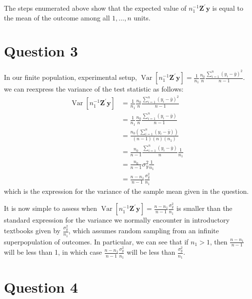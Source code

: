 \documentclass[
  12pt,
  leqno]{article}
\DeclareMathOperator{\Var}{\mathrm{Var}}
\DeclareMathOperator{\1}{\mathbbm{1}}
\begin{document}
The steps enumerated above show that the expected value of
\(n_1^{-1} \mathbf{Z}^{\prime}\mathbf{y}\) is equal to the mean of the
outcome among all \(1, \dots , n\) units.

\section*{Question 3}

In our finite population, experimental setup,
\(\Var\left[n_1^{-1} \mathbf{Z}^{\prime}\mathbf{y}\right] = \frac{1}{n_1} \frac{n_0}{n} \frac{\sum \limits_{i = 1}^n \left(y_i - \bar{y}\right)^2}{n - 1}\).
we can reexpress the variance of the test statistic as follows:
\begin{align*}
\Var\left[n_1^{-1} \mathbf{Z}^{\prime}\mathbf{y}\right] & = \frac{1}{n_1} \frac{n_0}{n} \frac{\sum \limits_{i = 1}^n \left(y_i - \bar{y}\right)^2}{n - 1} \\ 
& = \frac{1}{n_1} \frac{n_0}{n} \frac{\sum_{i = 1}^n \left(y_i - \bar{y}\right)}{n - 1} \\
& = \frac{n_0 \left(\sum_{i = 1}^n \left(y_i - \bar{y}\right)\right)}{\left(n - 1\right)\left(n\right) \left(n_1\right)} \\
& = \frac{n_0}{n - 1} \frac{\sum_{i = 1}^n \left(y_i - \bar{y}\right)}{n} \frac{1}{n_1} \\
& = \frac{n_0}{n - 1} \sigma^2_y \frac{1}{n_1} \\
& = \frac{n - n_1}{n - 1} \frac{\sigma^2_y}{n_1}
\end{align*} which is the expression for the variance of the sample mean
given in the question.

It is now simple to assess when
\(\Var\left[n_1^{-1} \mathbf{Z}^{\prime}\mathbf{y}\right] = \frac{n - n_1}{n - 1} \frac{\sigma^2_y}{n_1}\)
is smaller than the standard expression for the variance we normally
encounter in introductory textbooks given by \(\frac{\sigma^2_y}{n_1}\),
which assumes random sampling from an infinite superpopulation of
outcomes. In particular, we can see that if \(n_1 > 1\), then
\(\frac{n - n_1}{n - 1}\) will be less than 1, in which case
\(\frac{n - n_1}{n - 1} \frac{\sigma^2_y}{n_1}\) will be less than
\(\frac{\sigma^2_y}{n_1}\).

\section*{Question 4}
\end{document}

